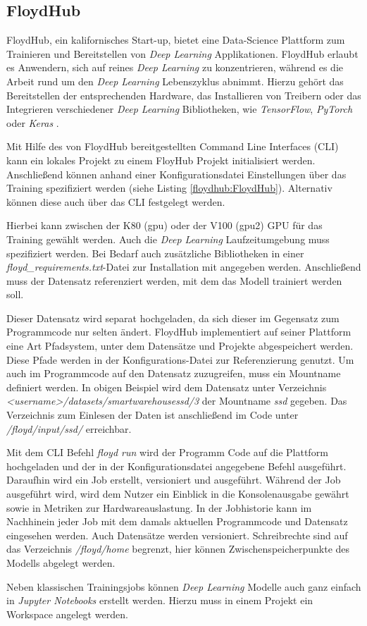 \subsection*{FloydHub}

FloydHub, ein kalifornisches Start-up, bietet eine Data-Science Plattform zum Trainieren und Bereitstellen von \textit{Deep Learning} Applikationen. FloydHub erlaubt es Anwendern, sich auf reines \textit{Deep Learning} zu konzentrieren, während es die Arbeit rund um den \textit{Deep Learning} Lebenszyklus abnimmt. Hierzu gehört das Bereitstellen der entsprechenden Hardware, das Installieren von Treibern oder das Integrieren verschiedener \textit{Deep Learning} Bibliotheken, wie \textit{TensorFlow}, \textit{PyTorch} oder \textit{Keras} \cite{FloydHub.20200215}. 

Mit Hilfe des von FloydHub bereitgestellten Command Line Interfaces (CLI) kann ein lokales Projekt zu einem FloyHub Projekt initialisiert werden. Anschließend können anhand einer Konfigurationsdatei Einstellungen über das Training spezifiziert werden (siehe Listing \ref{floydhub:FloydHub}). Alternativ können diese auch über das CLI festgelegt werden. 

\lstset{language=XML}


Hierbei kann zwischen der K80 (gpu) oder der V100 (gpu2) GPU für das Training gewählt werden. Auch die \textit{Deep Learning} Laufzeitumgebung muss spezifiziert werden. Bei Bedarf auch zusätzliche Bibliotheken in einer \textit{floyd\_requirements.txt}-Datei zur Installation mit angegeben werden. Anschließend muss der Datensatz referenziert werden, mit dem das Modell trainiert werden soll. 

Dieser Datensatz wird separat hochgeladen, da sich dieser im Gegensatz zum Programmcode nur selten ändert. FloydHub implementiert auf seiner Plattform eine Art Pfadsystem, unter dem Datensätze und Projekte abgespeichert werden. Diese Pfade werden in der Konfigurations-Datei zur Referenzierung genutzt. Um auch im Programmcode auf den Datensatz zuzugreifen, muss ein Mountname definiert werden. In obigen Beispiel wird dem Datensatz unter Verzeichnis \textit{<username>/datasets/smartwarehousessd/3} der Mountname \textit{ssd} gegeben. Das Verzeichnis zum Einlesen der Daten ist anschließend im Code unter \textit{/floyd/input/ssd/} erreichbar. 

Mit dem CLI Befehl \textit{floyd run} wird der Programm Code auf die Plattform hochgeladen und der in der Konfigurationsdatei angegebene Befehl ausgeführt. Daraufhin wird ein Job erstellt, versioniert und ausgeführt. Während der Job ausgeführt wird, wird dem Nutzer ein Einblick in die Konsolenausgabe gewährt sowie in Metriken zur Hardwareauslastung. In der Jobhistorie kann im Nachhinein jeder Job mit dem damals aktuellen Programmcode und Datensatz eingesehen werden. Auch Datensätze werden versioniert. Schreibrechte sind auf das Verzeichnis \textit{/floyd/home} begrenzt, hier können Zwischenspeicherpunkte des Modells abgelegt werden. 

Neben klassischen Trainingsjobs können \textit{Deep Learning} Modelle auch ganz einfach in \textit{Jupyter Notebooks} erstellt werden. Hierzu muss in einem Projekt ein Workspace angelegt werden.

